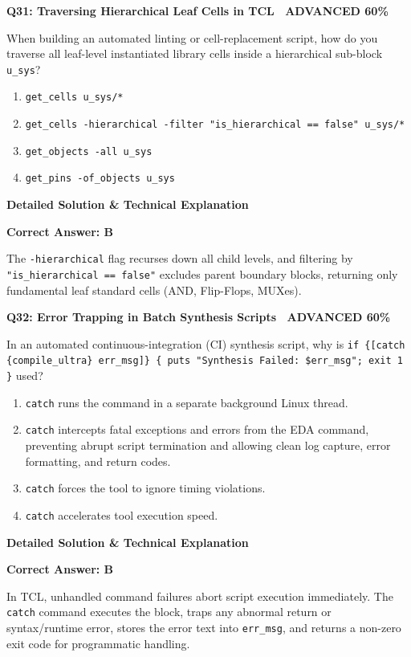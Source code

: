\documentclass[11pt,a4paper]{article}
\newcommand{\badgeadv}{{\color{white}\colorbox{advred}{\bfseries\sffamily\tiny\ ADVANCED 60\%\ }}}
\newenvironment{qbox}[2]{%
  \begin{mdframed}[style=qstyle]%
  {\bfseries\sffamily\color{primaryblue}#1 \hfill #2}\par\vspace{2pt}%
}{%
  \end{mdframed}%
}
\newenvironment{ansbox}{%
  \begin{mdframed}[style=ansstyle]%
  {\bfseries\sffamily\color{ansgreen}\small Detailed Solution \& Technical Explanation}\par\vspace{2pt}\small%
}{%
  \end{mdframed}%
}
\begin{document}
\begin{qbox}{Q31: Traversing Hierarchical Leaf Cells in TCL}{\badgeadv}
When building an automated linting or cell-replacement script, how do you traverse all leaf-level instantiated library cells inside a hierarchical sub-block \texttt{u\_sys}?
\begin{enumerate}[label=\textbf{\Alph*.}]
  \item \texttt{get\_cells u\_sys/*}
  \item \texttt{get\_cells -hierarchical -filter "is\_hierarchical == false" u\_sys/*}
  \item \texttt{get\_objects -all u\_sys}
  \item \texttt{get\_pins -of\_objects u\_sys}
\end{enumerate}
\end{qbox}
\begin{ansbox}
\textbf{Correct Answer: B}

The \texttt{-hierarchical} flag recurses down all child levels, and filtering by \texttt{"is\_hierarchical == false"} excludes parent boundary blocks, returning only fundamental leaf standard cells (AND, Flip-Flops, MUXes).
\end{ansbox}

\begin{qbox}{Q32: Error Trapping in Batch Synthesis Scripts}{\badgeadv}
In an automated continuous-integration (CI) synthesis script, why is \texttt{if \{[catch \{compile\_ultra\} err\_msg]\} \{ puts "Synthesis Failed: \$err\_msg"; exit 1 \}} used?
\begin{enumerate}[label=\textbf{\Alph*.}]
  \item \texttt{catch} runs the command in a separate background Linux thread.
  \item \texttt{catch} intercepts fatal exceptions and errors from the EDA command, preventing abrupt script termination and allowing clean log capture, error formatting, and return codes.
  \item \texttt{catch} forces the tool to ignore timing violations.
  \item \texttt{catch} accelerates tool execution speed.
\end{enumerate}
\end{qbox}
\begin{ansbox}
\textbf{Correct Answer: B}

In TCL, unhandled command failures abort script execution immediately. The \texttt{catch} command executes the block, traps any abnormal return or syntax/runtime error, stores the error text into \texttt{err\_msg}, and returns a non-zero exit code for programmatic handling.
\end{ansbox}
\end{document}
